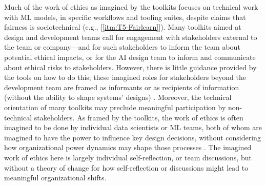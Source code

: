 \documentclass[acmsmall]{acmart}
\begin{document}
Much of the work of ethics as imagined by the toolkits focuses on technical work with ML models, in specific workflows and tooling suites, despite claims that fairness is sociotechnical (e.g., [\ref{itm:T5-Fairlearn}]). Many toolkits aimed at design and development teams call for engagement with stakeholders external to the team or company---and for such stakeholders to inform the team about potential ethical impacts, or for the AI design team to inform and communicate about ethical risks to stakeholders. %
However, there is little guidance provided by the tools on how to do this; these imagined roles for stakeholders beyond the development team are framed as informants or as recipients of information (without the ability to shape systems’ designs) \cite[cf.][]{delgado2021stakeholder,sloane2020participation}. Moreover, the technical orientation of many toolkits may preclude meaningful participation by non-technical stakeholders. As framed by the toolkits, the work of ethics is often imagined to be done by individual data scientists or ML teams, both of whom are imagined to have the power to influence key design decisions, without considering how organizational power dynamics may shape those processes \cite[cf.][]{madaio2020co,rakova2021responsible}. The imagined work of ethics here is largely individual self-reflection, or team discussions, but without a theory of change for how self-reflection or discussions might lead to meaningful organizational shifts. 
\end{document}
